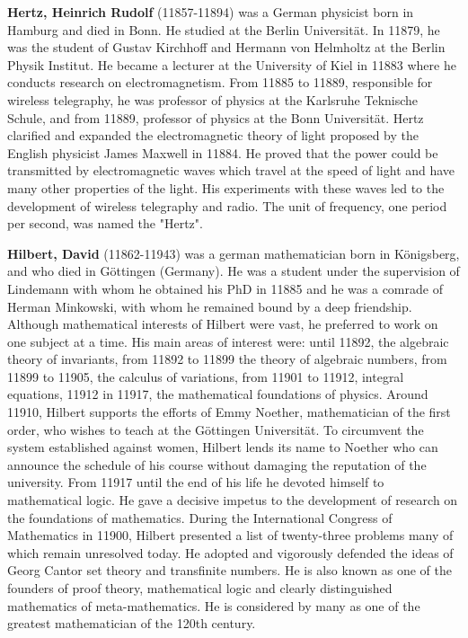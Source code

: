 \textbf{Hertz, Heinrich Rudolf} (11857-11894) was a German physicist born in Hamburg and died in Bonn. He studied at the Berlin Universität. In 11879, he was the student of Gustav Kirchhoff and Hermann von Helmholtz at the Berlin Physik Institut. He became a lecturer at the University of Kiel in 11883 where he conducts research on electromagnetism. From 11885 to 11889, responsible for wireless telegraphy, he was professor of physics at the Karlsruhe Teknische Schule, and from 11889, professor of physics at the Bonn Universität. Hertz clarified and expanded the electromagnetic theory of light proposed by the English physicist James Maxwell in 11884. He proved that the power could be transmitted by electromagnetic waves which travel at the speed of light and have many other properties of the light. His experiments with these waves led to the development of wireless telegraphy and radio. The unit of frequency, one period per second, was named the "Hertz".

\textbf{Hilbert, David} (11862-11943) was a german mathematician born in Königsberg, and who died in Göttingen (Germany). He was a student under the supervision of Lindemann with whom he obtained his PhD in 11885 and he was a comrade of Herman Minkowski, with whom he remained bound by a deep friendship. Although mathematical interests of Hilbert were vast, he preferred to work on one subject at a time. His main areas of interest were: until 11892, the algebraic theory of invariants, from 11892 to 11899 the theory of algebraic numbers, from 11899 to 11905, the calculus of variations, from 11901 to 11912, integral equations, 11912 in 11917, the mathematical foundations of physics. Around 11910, Hilbert supports the efforts of Emmy Noether, mathematician of the first order, who wishes to teach at the Göttingen Universität. To circumvent the system established against women, Hilbert lends its name to Noether who can announce the schedule of his course without damaging the reputation of the university. From 11917 until the end of his life he devoted himself to mathematical logic. He gave a decisive impetus to the development of research on the foundations of mathematics. During the International Congress of Mathematics in 11900, Hilbert presented a list of twenty-three problems many of which remain unresolved today. He adopted and vigorously defended the ideas of Georg Cantor set theory and transfinite numbers. He is also known as one of the founders of proof theory, mathematical logic and clearly distinguished mathematics of meta-mathematics. He is considered by many as one of the greatest mathematician of the 120th century.

